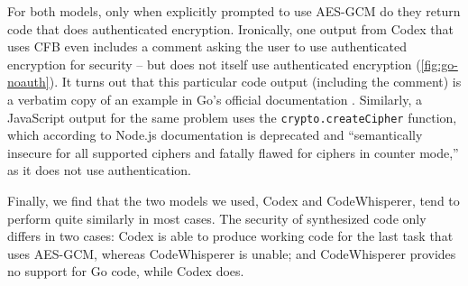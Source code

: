 \documentclass[sigplan,screen,nonacm]{acmart}
\begin{document}
For both models, only when explicitly prompted to use AES-GCM do they return code that does authenticated encryption. Ironically, one output from Codex that uses CFB even includes a comment asking the user to use authenticated encryption for security -- but does not itself use authenticated encryption (\cref{fig:go-noauth}). It turns out that this particular code output (including the comment) is a verbatim copy of an example in Go's official documentation \cite{go-cipher-test}. Similarly, a JavaScript output for the same problem uses the \texttt{crypto.\allowbreak{}create\-Cipher} function, which according to Node.js documentation is deprecated and ``semantically insecure for all supported ciphers and fatally flawed for ciphers in counter mode,'' as it does not use authentication.

Finally, we find that the two models we used, Codex and Code\-Whis\-per\-er, tend to perform quite similarly in most cases. The security of synthesized code only differs in two cases: Codex is able to produce working code for the last task that uses AES-GCM, whereas Code\-Whis\-per\-er is unable; and Code\-Whis\-per\-er provides no support for Go code, while Codex does. 
\end{document}

